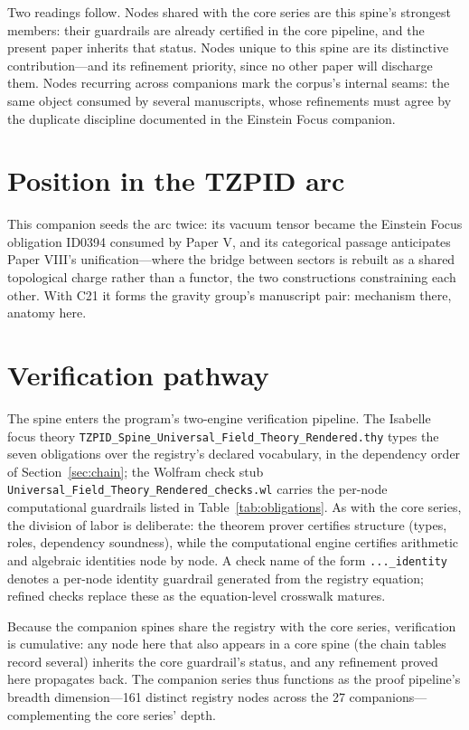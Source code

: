 \documentclass[11pt]{article}
\theoremstyle{remark}
\begin{document}
Two readings follow. Nodes shared with the core series are this spine's strongest members: their guardrails are already certified in the core pipeline, and the present paper inherits that status. Nodes unique to this spine are its distinctive contribution---and its refinement priority, since no other paper will discharge them. Nodes recurring across companions mark the corpus's internal seams: the same object consumed by several manuscripts, whose refinements must agree by the duplicate discipline documented in the Einstein Focus companion.

\section{Position in the TZPID arc}
\label{sec:arc}

This companion seeds the arc twice: its vacuum tensor became the Einstein Focus obligation ID0394 consumed by Paper V, and its categorical passage anticipates Paper VIII's unification---where the bridge between sectors is rebuilt as a shared topological charge rather than a functor, the two constructions constraining each other. With C21 it forms the gravity group's manuscript pair: mechanism there, anatomy here.

\section{Verification pathway}
\label{sec:verify}

The spine enters the program's two-engine verification pipeline. The Isabelle focus theory \texttt{TZPID\_Spine\_Universal\_Field\_Theory\_Rendered.thy} types the seven obligations over the registry's declared vocabulary, in the dependency order of Section~\ref{sec:chain}; the Wolfram check stub \texttt{Universal\_Field\_Theory\_Rendered\_checks.wl} carries the per-node computational guardrails listed in Table~\ref{tab:obligations}. As with the core series, the division of labor is deliberate: the theorem prover certifies structure (types, roles, dependency soundness), while the computational engine certifies arithmetic and algebraic identities node by node. A check name of the form \texttt{...\_identity} denotes a per-node identity guardrail generated from the registry equation; refined checks replace these as the equation-level crosswalk matures.

Because the companion spines share the registry with the core series, verification is cumulative: any node here that also appears in a core spine (the chain tables record several) inherits the core guardrail's status, and any refinement proved here propagates back. The companion series thus functions as the proof pipeline's breadth dimension---161 distinct registry nodes across the 27 companions---complementing the core series' depth.
\end{document}
